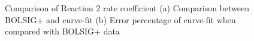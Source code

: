 \documentclass{warpdoc}
\begin{document}
\begin{figure}[H]
\centering     %
{}
\caption{Comparison of Reaction 2 rate coefficient (a) Comparison between BOLSIG+ and curve-fit (b) Error percentage of curve-fit when compared with BOLSIG+ data}
\label{fig:Reaction_2_comparison}
\end{figure}
%
%
\end{document}
